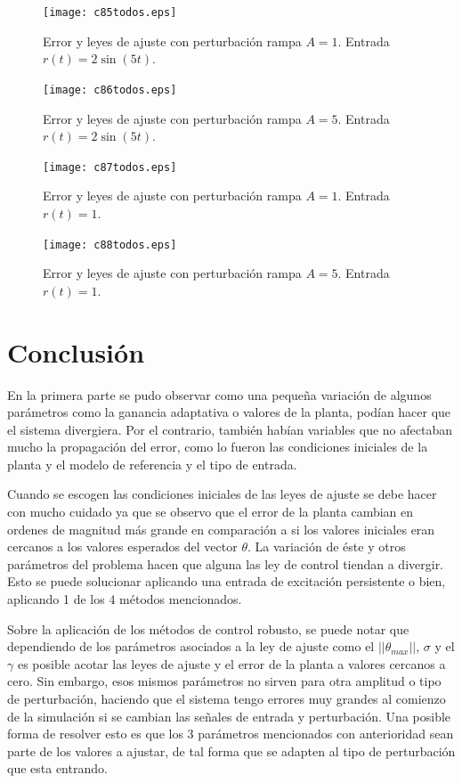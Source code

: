 \documentclass[letterpaper,11pt]{article} %
\begin{document}
\newpage
\begin{figure}[h]
	\centering
	\captionsetup{justification=centering}
	\texttt{[image: c85todos.eps]}
	\caption{Error y leyes de ajuste con perturbación rampa $A=1$. Entrada $r(t) =  2\sin(5t)$.}
	\label{osc1}
\end{figure}
\begin{figure}[h]
	\centering
	\captionsetup{justification=centering}
	\texttt{[image: c86todos.eps]}
	\caption{Error y leyes de ajuste con perturbación rampa $A=5$. Entrada $r(t) =  2\sin(5t)$.}
	\label{osc2}
\end{figure}
\newpage
\begin{figure}[h]
	\centering
	\captionsetup{justification=centering}
	\texttt{[image: c87todos.eps]}
	\caption{Error y leyes de ajuste con perturbación rampa $A=1$. Entrada $r(t) = 1$.}
	\label{osc3}
\end{figure}
\begin{figure}[h]
	\centering
	\captionsetup{justification=centering}
	\texttt{[image: c88todos.eps]}
	\caption{Error y leyes de ajuste con perturbación rampa $A=5$. Entrada $r(t) = 1$.}
	\label{osc4}
\end{figure}
\newpage
\section{Conclusión}
En la primera parte se pudo observar como una pequeña variación de algunos parámetros como la ganancia adaptativa o valores de la planta, podían hacer que el sistema divergiera. Por el contrario, también habían variables que no afectaban mucho la propagación del error, como lo fueron las condiciones iniciales de la planta y el modelo de referencia y el tipo de entrada. 

Cuando se escogen las condiciones iniciales de las leyes de ajuste se debe hacer con mucho cuidado ya que se observo que el error de la planta cambian en ordenes de magnitud más grande en comparación a si los valores iniciales eran cercanos a los valores esperados del vector $\theta$. La variación de éste y otros parámetros del problema hacen que alguna las ley de control tiendan a divergir. Esto se puede solucionar aplicando una entrada de excitación persistente o bien, aplicando 1 de los 4 métodos mencionados.

Sobre la aplicación de los métodos de control robusto, se puede notar que dependiendo de los parámetros asociados a la ley de ajuste como el $||\theta_{max}||$, $\sigma$ y el $\gamma$ es posible acotar las leyes de ajuste y el error de la planta a valores cercanos a cero. Sin embargo, esos mismos parámetros no sirven para otra amplitud o tipo de perturbación, haciendo que el sistema tengo errores muy grandes al comienzo de la simulación si se cambian las señales de entrada y perturbación. Una posible forma de resolver esto es que los 3 parámetros mencionados con anterioridad sean parte de los valores a ajustar, de tal forma que se adapten al tipo de perturbación que esta entrando.
\end{document}
